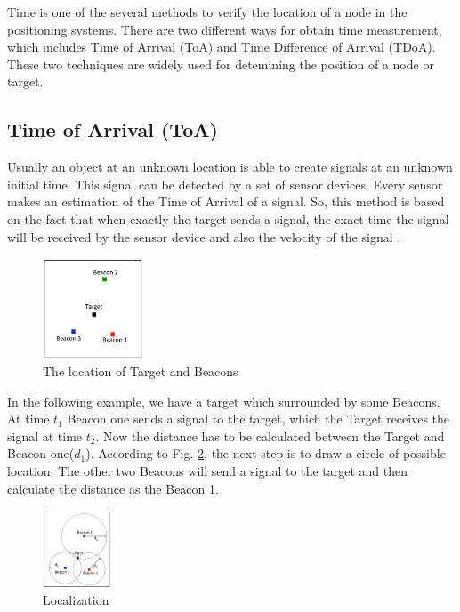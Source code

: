 Time is one of the several methods to verify the location of a node in the positioning systems. There are two different ways for obtain time measurement, which includes Time of Arrival (ToA) and Time Difference of Arrival (TDoA). These two techniques are widely used for detemining the position of a node or target.

\subsection{Time of Arrival (ToA)}

Usually an object at an unknown location is able to create signals at an unknown initial time. This signal can be detected by a set of sensor devices. Every sensor makes an estimation of the Time of Arrival of a signal. So, this method is based on the fact that when exactly the target sends a signal, the exact time the signal will be received by the sensor device and also the velocity of the signal \cite{brian17}.

\begin{figure}[htp]
    \centering
    \includegraphics[width=3cm]{1.jpg}
    \caption{The location of Target and Beacons \cite{brian17}}
    \label{fig:Target location}
\end{figure}

In the following example, we have a target which surrounded by some Beacons. At time $t_1$ Beacon one sends a signal to the target, which the Target receives the signal at time $t_2$. Now the distance has to be calculated between the Target and Beacon one($d_1$). According to Fig. \ref{fig:Localization}, the next step is to draw a circle of possible location. The other two Beacons will send a signal to the target and then calculate the distance as the Beacon 1.

\begin{figure}[htp]
    \centering
    \includegraphics[width=2cm]{2.jpg}
    \caption{Localization \cite{jin18}}
    \label{fig:Localization}
\end{figure}

